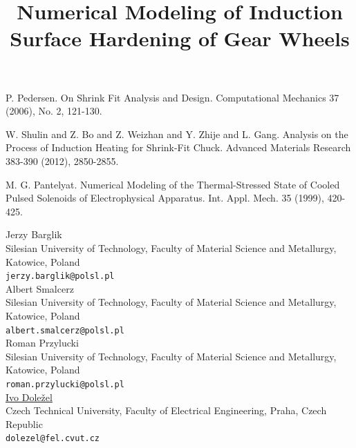 \documentclass[article, A4, 11pt]{llncs}%
\begin{document}

\begin{thebibliography}{10}
{\sc P. Pedersen}. {On Shrink Fit Analysis and Design}. Computational Mechanics 37 (2006), No. 2, 121-130.

{\sc W. Shulin and Z. Bo and Z. Weizhan and Y. Zhije and L. Gang}. {Analysis on the Process of Induction Heating for Shrink-Fit Chuck}. Advanced Materials Research 383-390 (2012), 2850-2855.

{\sc M. G. Pantelyat}. {Numerical Modeling of the Thermal-Stressed State of Cooled Pulsed Solenoids of Electrophysical Apparatus}. Int. Appl. Mech. 35 (1999), 420-425.
\end{thebibliography} %

\title{Numerical Modeling of Induction Surface Hardening of Gear Wheels}
 \author{} \institute{}
\maketitle
\begin{center}
{\large Jerzy Barglik}\\
Silesian University of Technology, Faculty of Material Science and Metallurgy, Katowice, Poland\\
{\tt jerzy.barglik@polsl.pl}
\\ \vspace{4mm}
{\large Albert  Smalcerz}\\
Silesian University of Technology, Faculty of Material Science and Metallurgy, Katowice, Poland\\
{\tt albert.smalcerz@polsl.pl}
\\ \vspace{4mm}
{\large Roman Przylucki}\\
Silesian University of Technology, Faculty of Material Science and Metallurgy, Katowice, Poland\\
{\tt roman.przylucki@polsl.pl}
\\ \vspace{4mm}
{\large \underline{Ivo Doležel}}\\
Czech Technical University, Faculty of Electrical Engineering, Praha, Czech Republic\\
{\tt dolezel@fel.cvut.cz}
\end{center}
\end{document}
